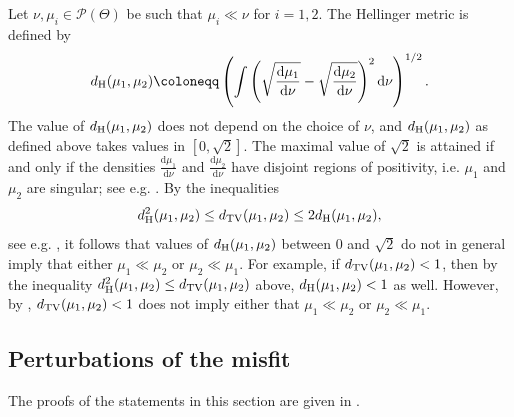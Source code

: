 \documentclass[a4paper]{scrartcl}
\theoremstyle{definition}
\numberwithin{equation}{section}
\newcommand{\rd}{\mathrm{d}}
\newcommand{\Hel}[0]{\textup{H}}
\newcommand{\TV}[0]{\textup{TV}}
\begin{document}
Let $\nu,\mu_i\in\mathcal{P}(\Theta)$ be such that $\mu_i\ll\nu$ for $i=1,2$.
The Hellinger metric is defined by
\begin{equation}
 d_\Hel(\mu_1,\mu_2)\coloneqq  \left( \int \left(\sqrt{\frac{\rd\mu_1}{\rd\nu}}-\sqrt{\frac{\rd\mu_2}{\rd\nu}}\right)^2\rd \nu\right)^{1/2}.
 \label{eq_Hellinger_metric}
\end{equation}
 The value of $d_\Hel(\mu_1,\mu_2)$ does not depend on the choice of $\nu$, and $d_{\Hel}(\mu_1,\mu_2)$ as defined above takes values in $[0,\sqrt{2}]$.
 The maximal value of $\sqrt{2}$ is attained if and only if the densities $\tfrac{\rd\mu_1}{\rd\nu}$ and $\tfrac{\rd\mu_2}{\rd\nu}$ have disjoint regions of positivity, i.e. $\mu_1$ and $\mu_2$ are singular; see e.g. \cite[Section B.1]{GhosalvanderVaart2017}.
 By the inequalities 
 \begin{equation*}
  d_{\Hel}^2(\mu_1,\mu_2)\leq d_{\TV}(\mu_1,\mu_2)\leq 2d_{\Hel}(\mu_1,\mu_2),
 \end{equation*}
see e.g. \cite[Lemma B.1]{GhosalvanderVaart2017}, it follows that values of $d_{\Hel}(\mu_1,\mu_2)$ between 0 and $\sqrt{2}$ do not in general imply that either $\mu_1\ll\mu_2$ or $\mu_2\ll\mu_1$.
For example, if $d_{\TV}(\mu_1,\mu_2)<1$, then by the inequality $d_{\Hel}^2(\mu_1,\mu_2)\leq d_{\TV}(\mu_1,\mu_2)$ above, $d_{\Hel}(\mu_1,\mu_2)<1$ as well.
However, by , $d_{\TV}(\mu_1,\mu_2)<1$ does not imply either that $\mu_1\ll\mu_2$ or $\mu_2\ll \mu_1$.
 


\subsection{Perturbations of the misfit}
\label{sectionHellingerbounds_misfit_perturbation}

The proofs of the statements in this section are given in .
\end{document}

